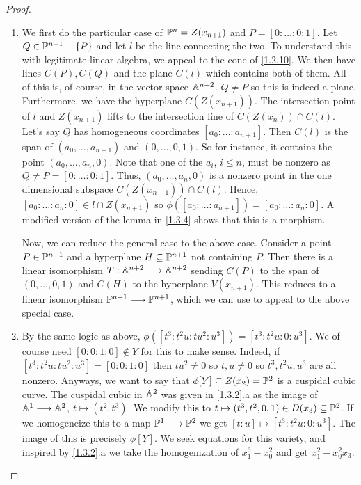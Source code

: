 \begin{proof}
    \begin{enumerate}[label = (\alph*)]
        \item We first do the particular case of $\P^n = Z(x_{n+1})$ and $P = [0 : \dots : 0 : 1]$. Let $Q \in \P^{n+1} - \curly{P}$ and let $l$ be the line connecting the two. To understand this with legitimate linear algebra, we appeal to the cone of \ref{1.2.10}. We then have lines $C(P), C(Q)$ and the plane $C(l)$ which contains both of them. All of this is, of course, in the vector space $\A^{n + 2}$. $Q \neq P$ so this is indeed a plane. Furthermore, we have the hyperplane $C(Z(x_{n+1}))$. The intersection point of $l$ and $Z(x_{n+1})$ lifts to the intersection line of $C(Z(x_n)) \cap C(l)$. Let's say $Q$ has homogeneous coordinates $[a_0 : \dots : a_{n+1}]$. Then $C(l)$ is the span of $(a_0, \dots, a_{n+1})$ and $(0, \dots, 0, 1)$. So for instance, it contains the point $(a_0, \dots, a_n, 0)$. Note that one of the $a_i$, $i \leq n$, must be nonzero as $Q \neq P = [0 : \dots : 0 : 1]$. Thus, $(a_0, \dots, a_n, 0)$ is a nonzero point in the one dimensional subspace $C(Z(x_{n+1})) \cap C(l)$. Hence, $[a_0 : \dots : a_n : 0] \in l \cap Z(x_{n+1})$ so $\phi([a_0 : \dots : a_{n+1}]) = [a_0 : \dots : a_n : 0]$. A modified version of the lemma in \ref{1.3.4} shows that this is a morphism.

        Now, we can reduce the general case to the above case. Consider a point $P \in \P^{n + 1}$ and a hyperplane $H \subseteq \P^{n+1}$ not containing $P$. Then there is a linear isomorphism $T: \A^{n + 2} \longrightarrow \A^{n + 2}$ sending $C(P)$ to the span of $(0, \dots, 0, 1)$ and $C(H)$ to the hyperplane $V(x_{n+1})$. This reduces to a linear isomorphism $\P^{n + 1} \longrightarrow \P^{n + 1}$, which we can use to appeal to the above special case.

        \item By the same logic as above, $\phi([t^3 : t^2 u : tu^2 : u^3]) = [t^3 : t^2 u : 0 : u^3]$. We of course need $[0 : 0 : 1 : 0] \notin Y$ for this to make sense. Indeed, if $[t^3 : t^2 u : t u^2 : u^3] = [0 : 0 : 1 : 0]$ then $t u^2 \neq 0$ so $t, u \neq 0$ so $t^3, t^2 u, u^3$ are all nonzero. Anyways, we want to say that $\phi[Y] \subseteq Z(x_2) = \P^2$ is a cuspidal cubic curve. The cuspidal cubic in $\A^2$ was given in \ref{1.3.2}.a as the image of $\A^1 \longrightarrow \A^2$, $t \mapsto (t^2, t^3)$. We modify this to $t \mapsto (t^3, t^2, 0, 1) \in D(x_3) \subseteq \P^2$. If we homogeneize this to a map $\P^1 \longrightarrow \P^2$ we get $[t : u] \mapsto [t^3 : t^2 u : 0 : u^3]$. The image of this is precisely $\phi[Y]$. We seek equations for this variety, and inspired by \ref{1.3.2}.a we take the homogenization of $x_1^3 - x_0^2$ and get $x_1^2 - x_0^2 x_3$.


\end{enumerate}
\end{proof}
